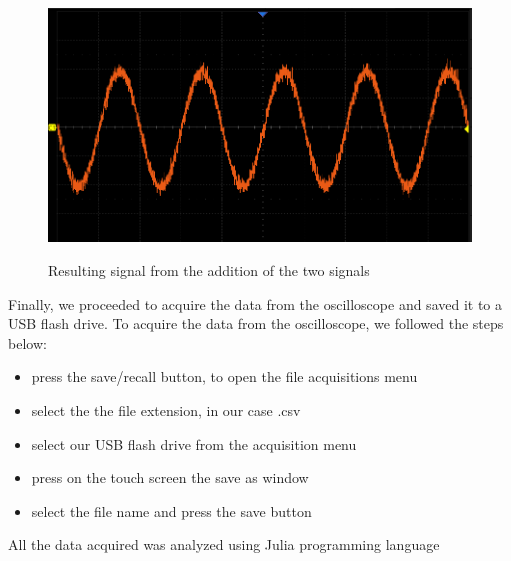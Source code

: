 \documentclass[a4paper,12pt]{article}
\begin{document}
\begin{figure}[H]
    \vspace{0.5cm} %
    \begin{minipage}[b]{0.40\linewidth} %
        \centering
        \includegraphics[width=\linewidth]{noise_signal.png}
        \label{fig:sin+noise_signal}
        \caption{Resulting signal from the addition of the two signals} 
    \end{minipage}
    
\end{figure}
Finally, we proceeded to acquire the data from the oscilloscope and saved it to a USB flash drive.
To acquire the data from the oscilloscope, we followed the steps below:
\begin{itemize}
    \item press the save/recall button, to open the file acquisitions menu
    \item select the the file extension, in our case .csv
    \item select our USB flash drive from the acquisition menu
    \item press on the touch screen the save as window
    \item select the file name and press the save button
\end{itemize}
All the data acquired was analyzed using Julia programming language 
 
\end{document}
